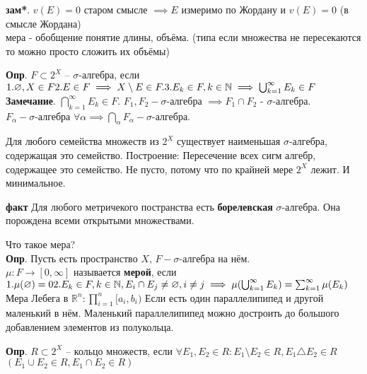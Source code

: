 \documentclass[12pt, a4paper]{article}
\theoremstyle{plain}
\begin{document}
    \textbf{зам*}. $v(E) = 0$ старом смысле $\implies E$ измеримо по Жордану и $v(E)=0$ (в смысле Жордана)
    \\

    мера - обобщение понятие длины, объёма. (типа если множества не пересекаются то можно просто сложить их объёмы) 
    
    \textbf{Опр}. $F \subset 2^X $ -- $\sigma$-алгебра, если 
    $\\
    1. \varnothing, X \in F \\
    2. E \in F \implies X \setminus E \in F. \\
    3. E_k \in F, k \in \mathbb{N} \implies \bigcup_{k=1}^\infty E_k \in F 
    $\\

    \textbf{Замечание}. $\bigcap^\infty_{k=1} E_k \in F$. $F_1, F_2 - \sigma$-алгебра $\implies F_1 \cap F_2$ - $\sigma$-алгебра.\\
    $F_\alpha - \sigma$-алгебра $\forall \alpha \implies \bigcap_\alpha F_\alpha - \sigma$-алгебра.

    Для любого семейства множеств из $2^X$ существует наименьшая $\sigma$-алгебра,
    содержащая это семейство. Построение: Пересечение всех сигм алгебр, содержащее это семейство.
    Не пусто, потому что по крайней мере $2^X$ лежит. И минимальное.

    \textbf{факт} Для любого метричекого постранства есть \textbf{борелевская} $\sigma$-алгебра. 
    Она порождена всеми открытыми множествами.

    Что такое мера?\\
    \textbf{Опр}. Пусть есть пространство $X$, $F - \sigma$-алгебра на нём.\\
    $\mu: F \to [0, \infty]$ называется \textbf{мерой}, если
    $\\
    1. \mu(\varnothing) = 0 \\
    2. E_k \in F, k \in \mathbb{N}, E_i \cap E_j \neq \varnothing, i\neq j \implies
    \mu(\bigcup^\infty_{k=1} E_k) = \sum^\infty_{k=1} \mu(E_k)
    $\\

    Мера Лебега в $\mathbb{R}^n: \prod^n_{i=1}[a_i, b_i)$
    Если есть один параллелипипед и другой маленький в нём. 
    Маленький параллелипипед можно достроить до большого добавлением элементов
    из полукольца. %

    \textbf{Опр}. $R \subset 2^X$ -- кольцо множеств, если 
    $\forall E_1, E_2 \in R: E_1 \setminus E_2 \in R, E_1 \triangle E_2 \in R$\\
    $(E_1 \cup E_2 \in R, E_1 \cap E_2 \in R)$\\
\end{document}
